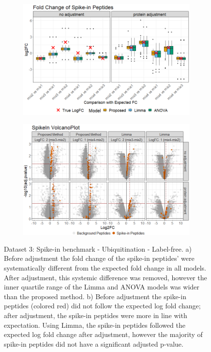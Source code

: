 \documentclass[mcp]{article}
\numberwithin{table}{section}
\begin{document}
\begin{figure}[ht]
\centering
\begin{subfigure}[c]{0.825\linewidth}
\includegraphics[width=1\textwidth]{images/spike_in_fc.png}
\caption{}
\label{fig:spikein_boxplot}
\end{subfigure}
\begin{subfigure}[c]{0.825\linewidth}
\includegraphics[width=1\textwidth]{images/spike_in_volcano.png}
\caption{}
\label{fig:spikein_prop_volcano}
\end{subfigure}
\caption{Dataset 3: Spike-in benchmark - Ubiquitination - Label-free. a) Before adjustment the fold change of the spike-in peptides' were systematically different from the expected fold change in all models. After adjustment, this systemic difference was removed, however the inner quartile range of the Limma and ANOVA models was wider than the proposed method. b) Before adjustment the spike-in peptides (colored red) did not follow the expected log fold change; after adjustment, the spike-in peptides were more in line with expectation. Using Limma, the spike-in peptides followed the expected log fold change after adjustment, however the majority of spike-in peptides did not have a significant adjusted p-value.}
\label{fig:spikein_volcano}
\end{figure}
\end{document}
